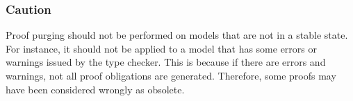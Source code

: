 \subsubsection{Caution}

Proof purging should not be performed on models that are not in a stable state. For instance, it should not be applied to a model that has some errors or warnings issued by the type checker. This is because if there are errors and warnings, not all proof obligations are generated. Therefore, some proofs may have been considered wrongly as obsolete.

